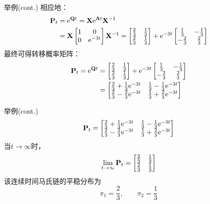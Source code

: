 \documentclass[t]{beamer}
\begin{document}
\begin{frame}{举例(cont.)}
相应地：\[\begin{split}
{\bf P}_t&={\rm e}^{{\bf Q}t}={\bf X}{\rm e}^{\bm{\Lambda}t}{\bf X}^{-1}\\
&={\bf X}\begin{bmatrix}
1&0\\
0&{\rm e}^{-3t}
\end{bmatrix}{\bf X}^{-1}=\begin{bmatrix}
\frac{2}{3}&\frac{1}{3}\\\frac{2}{3}&\frac{1}{3}
\end{bmatrix}+{\rm e}^{-3t}\begin{bmatrix}
\frac{1}{3}&-\frac{1}{3}\\-\frac{2}{3}&\frac{2}{3}
\end{bmatrix}\\
\end{split} \]
最终可得转移概率矩阵：
\[\begin{split}
{\bf P}_t={\rm e}^{{\bf Q}t}&=\begin{bmatrix}
\frac{2}{3}&\frac{1}{3}\\\frac{2}{3}&\frac{1}{3}
\end{bmatrix}+{\rm e}^{-3t}\begin{bmatrix}
\frac{1}{3}&-\frac{1}{3}\\-\frac{2}{3}&\frac{2}{3}
\end{bmatrix}\\
&=\begin{bmatrix}
	\frac{2}{3}+\frac{1}{3}{\rm e}^{-3t}&\frac{1}{3}-\frac{1}{3}{\rm e}^{-3t}\\
	\frac{2}{3}-\frac{2}{3}{\rm e}^{-3t}&\frac{1}{3}+\frac{2}{3}{\rm e}^{-3t}
\end{bmatrix}
\end{split}
\]
\end{frame}


\begin{frame}{举例(cont.)}
  \[{\bf P}_t=\begin{bmatrix}
    \frac{2}{3}+\frac{1}{3}{\rm e}^{-3t}&\frac{1}{3}-\frac{1}{3}{\rm e}^{-3t}\\
    \frac{2}{3}-\frac{2}{3}{\rm e}^{-3t}&\frac{1}{3}+\frac{2}{3}{\rm e}^{-3t}
  \end{bmatrix} \]
  当$t\to\infty$时，
  \[\lim_{t\to\infty}{\bf P}_t=\begin{bmatrix}
  \frac{2}{3}&\frac{1}{3}\\\frac{2}{3}&\frac{1}{3}
  \end{bmatrix} \]
  该连续时间马氏链的平稳分布为
\[\pi_1=\frac{2}{3},\qquad 
\pi_2=\frac{1}{3}\]
\end{frame}
\end{document}
